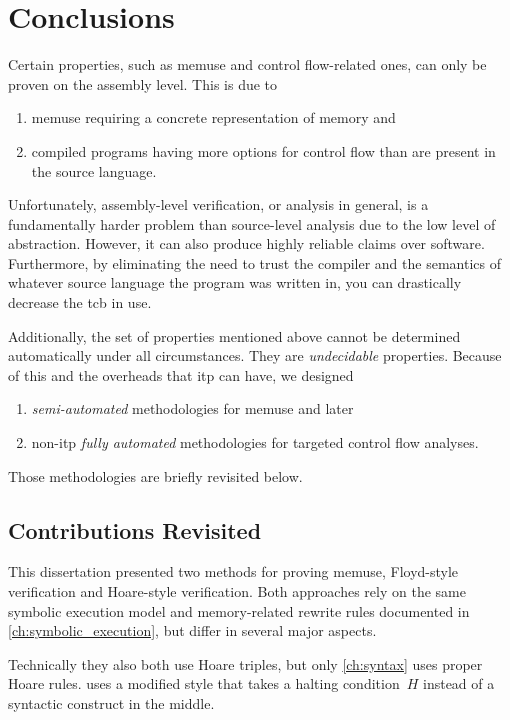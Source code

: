 \chapter{Conclusions}\label{ch:conclusions}
Certain properties, such as \gls{memuse} and control flow-related ones, can only be proven on the assembly level.
This is due to
\begin{enumerate}
  \item \gls{memuse} requiring a concrete representation of memory and
  \item compiled programs having more options for control flow than are present in the source language.
\end{enumerate}
Unfortunately, assembly-level verification, or analysis in general, is a fundamentally harder problem than source-level analysis due to the low level of abstraction.
However, it can also produce highly reliable claims over software.
Furthermore, by eliminating the need to trust the compiler and the semantics of whatever source language the program was written in, you can drastically decrease the \ac{tcb} in use.

Additionally, the set of properties mentioned above cannot be determined automatically under all circumstances. They are \emph{undecidable} properties.
Because of this and the overheads that \ac{itp} can have, we designed
\begin{enumerate}
  \item \emph{semi-automated} methodologies for \gls{memuse} and later
  \item non-\ac{itp} \emph{fully automated} methodologies for targeted control flow analyses.
\end{enumerate}
Those methodologies are briefly revisited below.

\section{Contributions Revisited}
This dissertation presented two methods for proving \gls{memuse},
Floyd-style verification and Hoare-style verification.
Both approaches rely on the same symbolic execution model and memory-related rewrite rules documented in \cref{ch:symbolic_execution}, but differ in several major aspects.
\begin{remark}
  Technically they also both use Hoare triples, but only \cref{ch:syntax} uses proper Hoare rules.
   uses a modified style that takes a halting condition~$H$ instead of a syntactic construct in the middle.
\end{remark}

